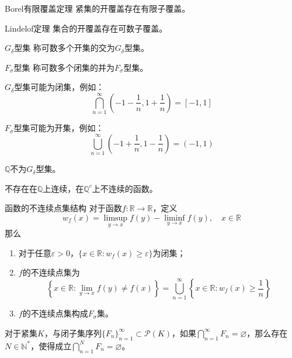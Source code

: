 \documentclass[lang = cn, scheme = chinese, thmcnt = section]{elegantbook}
\newcommand{\N}{\mathbb{N}}            %
\newcommand{\R}{\mathbb{R}}            %
\newcommand{\Q}{\mathbb{Q}}            %
\newcommand{\sub}{\subset}             %
\begin{document}
\begin{theorem}{Borel有限覆盖定理}
	紧集的开覆盖存在有限子覆盖。
\end{theorem}

\begin{theorem}{Lindelof定理}
	集合的开覆盖存在可数子覆盖。
\end{theorem}

\begin{definition}{$G_\delta$型集}
	称可数多个开集的交为$G_\delta$型集。
\end{definition}

\begin{definition}{$F_\sigma$型集}
	称可数多个闭集的并为$F_\sigma$型集。
\end{definition}

\begin{note}
	$G_\delta$型集可能为闭集，例如：%
	$$
	\bigcap_{n=1}^{\infty}\left(-1-\frac{1}{n},1+\frac{1}{n}\right)=[-1,1]
	$$
\end{note}

\begin{note}
	$F_\sigma$型集可能为开集，例如：%
	$$
	\bigcup_{n=1}^{\infty}\left(-1+\frac{1}{n},1-\frac{1}{n}\right)=(-1,1)
	$$
\end{note}

\begin{exercise}
	$\Q$不为$G_\delta$型集。
\end{exercise}

\begin{exercise}
	不存在在$\Q$上连续，在$\Q^c$上不连续的函数。
\end{exercise}

\begin{theorem}{函数的不连续点集结构}
	对于函数$f:\R\to\R$，定义
	$$
	w_f(x)=\limsup_{y\to x}f(y)-\liminf_{y\to x}f(y),\quad x\in\R
	$$
	那么
	\begin{enumerate}
		\item 对于任意$\varepsilon>0$，$\{ x\in\R:w_f(x)\ge \varepsilon \}$为闭集；
		\item $f$的不连续点集为%
		$$
		\left\{ x\in\R:\lim_{y\to x}f(y)\ne f(x) \right\}=\bigcup_{n=1}^{\infty}\left\{ x\in\R:w_f(x)\ge\frac{1}{n} \right\}
		$$
		\item $f$的不连续点集构成$F_\sigma$集。
	\end{enumerate}
\end{theorem}

\begin{exercise}
	对于紧集$K$，与闭子集序列$\{F_n\}_{n=1}^{\infty}\sub\mathscr{P}(K)$，如果$\bigcap\limits_{n=1}^{\infty}F_n=\varnothing$，那么存在$N\in\N^*$，使得成立$\bigcap\limits_{n=1}^{N}F_n=\varnothing$。
\end{exercise}
\end{document}
